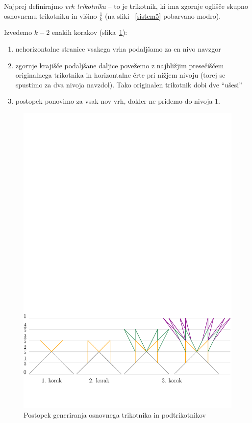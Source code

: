 \documentclass[a4paper, 12pt]{article}
\begin{document}
Najprej definirajmo \emph{vrh trikotnika} -- to je trikotnik, ki ima zgornje oglišče skupno osnovnemu trikotniku in višino $ \frac{1}{k} $ (na sliki ~\ref{sistem5} pobarvano modro).

Izvedemo $ k - 2 $ enakih korakov (slika~\ref{koraki}):

\begin{enumerate}
    \item nehorizontalne stranice vsakega vrha podaljšamo za en nivo navzgor
    \item zgornje krajišče podaljšane daljice povežemo z najbližjim presečiščem originalnega trikotnika in horizontalne črte pri nižjem nivoju (torej se spustimo za dva nivoja navzdol). Tako originalen trikotnik dobi dve ``ušesi''
    \item postopek ponovimo za vsak nov vrh, dokler ne pridemo do nivoja 1.
\end{enumerate}

\begin{figure}[h!]
    \centering
    \includegraphics[width=\textwidth]{ipe_slike/koraki.pdf}
    \caption{Postopek generiranja osnovnega trikotnika in podtrikotnikov}
    \label{koraki}
\end{figure}
\end{document}
